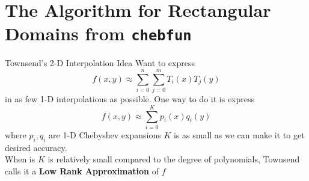 \documentclass[xcolor={rgb,dvipsnames}]{beamer}		%
\begin{document}

\section{The Algorithm for Rectangular Domains from {\tt chebfun}}

\begin{frame}
\tableofcontents[currentsection]
\end{frame}


\begin{frame}{Townsend's 2-D Interpolation Idea\footnotemark[1]}
Want to express
$$f(x,y)\approx\sum_{i=0}^n\sum_{j=0}^mT_i(x)T_j(y)$$
in as few 1-D interpolations as possible. One way to do it is express
$$f(x,y)\approx\sum_{i=0}^Kp_i(x)q_i(y)$$
where $p_i,q_i$ are 1-D Chebyshev expansions $K$ is as small as we can make it to get desired accuracy.\\						%
\bigskip
When is $K$ is relatively small compared to the degree of polynomials, Townsend calls it a {\bf Low Rank Approximation} of $f$
\end{frame}
\end{document}
